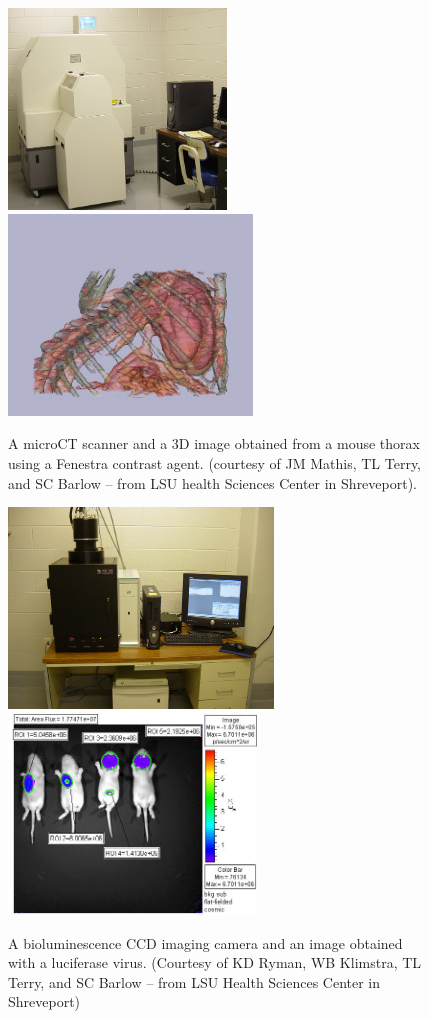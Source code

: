 \begin{figure}[!htb]
	\centering
	\includegraphics[height=2.1in]{./figures/Topic10/Fig10-19a.png}
	\includegraphics[height=2.1in]{./figures/Topic10/Fig10-19b.png}
	\caption{A microCT scanner and a 3D image obtained from a mouse thorax using a Fenestra contrast agent. (courtesy of JM Mathis, TL Terry, and SC Barlow -- from LSU health Sciences Center in Shreveport).}
	\label{Fig10-19}
\end{figure} 	 	 
\begin{figure}[!htb]
	\centering
	\includegraphics[height=2.1in]{./figures/Topic10/Fig10-20a.png}
	\includegraphics[height=2.1in]{./figures/Topic10/Fig10-20b.png}
	\caption{A bioluminescence CCD imaging camera and an image obtained with a luciferase virus. (Courtesy of  KD Ryman, WB Klimstra, TL Terry, and SC Barlow -- from LSU Health Sciences Center in Shreveport)}
	\label{Fig10-20}
\end{figure}




